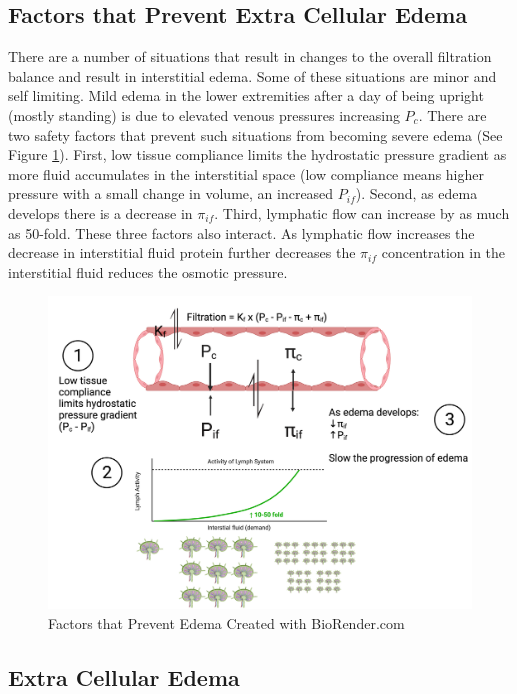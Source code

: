 \subsection{Factors that Prevent Extra Cellular Edema}

There are a number of situations that result in changes to the overall filtration balance and result in interstitial edema. Some of these situations are minor and self limiting. Mild edema in the lower extremities after a day of being upright (mostly standing) is due to elevated venous pressures increasing $P_c$. There are two safety factors that prevent such situations from becoming severe edema (See Figure \ref{fig:Factors_Prevent_Edema}). First, low tissue compliance limits the hydrostatic pressure gradient as more fluid accumulates in the interstitial space (low compliance means higher pressure with a small change in volume, an increased $P_{if}$). Second, as edema develops there is a decrease in $\pi_{if}$. Third, lymphatic flow can increase by as much as 50-fold. These three factors also interact. As lymphatic flow increases the decrease in interstitial fluid protein further decreases the $\pi_{if}$ concentration in the interstitial fluid reduces the osmotic pressure.

\begin{figure}[!h]
    \centering
    \includegraphics[width=1\linewidth]{./figure/Factors_Prevent_Edema.png}
    \caption{Factors that Prevent Edema \footnotesize{Created with BioRender.com}}
    \label{fig:Factors_Prevent_Edema}
\end{figure}

\subsection{Extra Cellular Edema}

